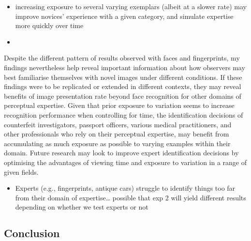 \documentclass[
  english,
  man]{apa6}
\providecommand{\tightlist}{%
  \setlength{\itemsep}{0pt}\setlength{\parskip}{0pt}}
\begin{document}
\begin{itemize}
\tightlist
\item
  increasing exposure to several varying exemplars (albeit at a slower rate) may improve novices' experience with a given category, and simulate expertise more quickly over time
\item
\end{itemize}

Despite the different pattern of results observed with faces and fingerprints, my findings nevertheless help reveal important information about how observers may best familiarise themselves with novel images under different conditions. If these findings were to be replicated or extended in different contexts, they may reveal benefits of image presentation rate beyond face recognition for other domains of perceptual expertise. Given that prior exposure to variation seems to increase recognition performance when controlling for time, the identification decisions of counterfeit investigators, passport officers, various medical practitioners, and other professionals who rely on their perceptual expertise, may benefit from accumulating as much exposure as possible to varying examples within their domain. Future research may look to improve expert identification decisions by optimising the advantages of viewing time and exposure to variation in a range of given fields.

\begin{itemize}
\tightlist
\item
  Experts (e.g., fingerprints, antique cars) struggle to identify things too far from their domain of expertise\ldots{} possible that exp 2 will yield different results depending on whether we test experts or not
\end{itemize}

\hypertarget{conclusion}{%
\subsection{Conclusion}\label{conclusion}}
\end{document}
